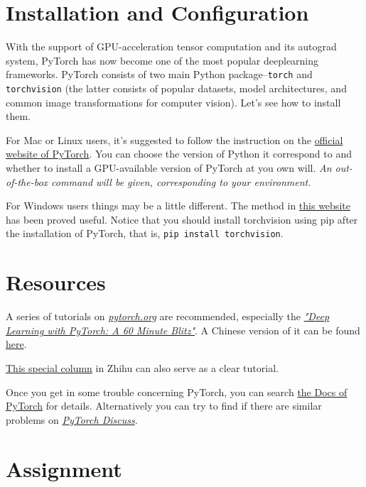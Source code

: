 \documentclass[english]{../TeXTemplate/pkupaper}
\title{\titlemark}
\author{Jason Jia\and Narsil Zhang}
\date{Updated on March 27}
\begin{document}
\maketitle
\section{Installation and Configuration}

With the support of GPU-acceleration tensor computation and its autograd system, PyTorch has now become one of the most popular deeplearning frameworks. PyTorch consists of two main Python package--\verb"torch" and \verb"torchvision" (the latter consists of popular datasets, model architectures, and common image transformations for computer vision). Let's see how to install them.

For Mac or Linux users, it's suggested to follow the instruction on the \href{http://pytorch.org}{official website of PyTorch}. You can choose the version of Python it correspond to and whether to install a GPU-available version of PyTorch at you own will. \emph{An out-of-the-box command will be given, corresponding to your environment.}

For Windows users things may be a little different. The method in \href{https://zhuanlan.zhihu.com/p/26871672}{this website} has been proved useful. Notice that you should install torchvision using pip after the installation of PyTorch, that is, \verb"pip install torchvision".

\section{Resources}

A series of tutorials on \href{http://pytorch.org}{\emph{pytorch.org}} are recommended, especially the \href{http://pytorch.org/tutorials/beginner/deep_learning_60min_blitz.html}{\emph{"Deep Learning with PyTorch: A 60 Minute Blitz"}}. A Chinese version of it can be found \href{https://zhuanlan.zhihu.com/p/25572330}{here}.

\href{https://zhuanlan.zhihu.com/c_94953554}{This special column} in Zhihu can also serve as a clear tutorial.

Once you get in some trouble concerning PyTorch, you can search \href{http://pytorch.org/docs/master/index.html}{the Docs of PyTorch} for details. Alternatively you can try to find if there are similar problems on \href{https://discuss.pytorch.org/}{\emph{PyTorch Discuss}}. 

\section{Assignment}
\end{document}

